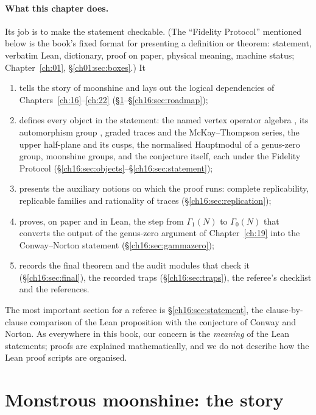 \paragraph{What this chapter does.}  Its job is to make the statement checkable.  (The ``Fidelity Protocol'' mentioned below is the book's
fixed format for presenting a definition or theorem: statement, verbatim Lean, dictionary, proof on paper, physical
meaning, machine status; Chapter~\ref{ch:01}, \S\ref{ch01:sec:boxes}.)  It
\begin{enumerate}[label=(\arabic*)]
\item tells the story of moonshine and lays out the logical dependencies of Chapters~\ref{ch:16}--\ref{ch:22}
  (\S\ref{ch16:sec:history}--\S\ref{ch16:sec:roadmap});
\item defines every object in the statement: the named vertex operator algebra , its automorphism
  group , graded traces and the McKay--Thompson series, the upper half-plane and its cusps, the
  normalised Hauptmodul of a genus-zero group, moonshine groups, and the conjecture itself, each under the Fidelity
  Protocol (\S\ref{ch16:sec:objects}--\S\ref{ch16:sec:statement});
\item presents the auxiliary notions on which the proof runs: complete replicability, replicable families and
  rationality of traces (\S\ref{ch16:sec:replication});
\item proves, on paper and in Lean, the step from $\Gamma_1(N)$ to $\Gamma_0(N)$ that converts the output of the
  genus-zero argument of Chapter~\ref{ch:19} into the Conway--Norton statement (\S\ref{ch16:sec:gammazero});
\item records the final theorem and the audit modules that check it (\S\ref{ch16:sec:final}), the recorded traps
  (\S\ref{ch16:sec:traps}), the referee's checklist and the references.
\end{enumerate}
The most important section for a referee is \S\ref{ch16:sec:statement}, the clause-by-clause comparison of the Lean
proposition  with the conjecture of Conway and Norton.  As everywhere in this book, our
concern is the \emph{meaning} of the Lean statements; proofs are explained mathematically, and we do not describe how
the Lean proof scripts are organised.

\section{Monstrous moonshine: the story}\label{ch16:sec:history}

